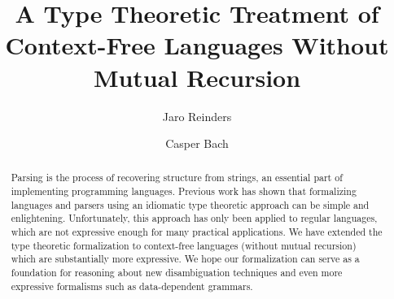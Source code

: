 \documentclass[runningheads]{llncs}
\begin{document}
%
\title{A Type Theoretic Treatment of Context-Free Languages Without Mutual Recursion}
%
%
\author{Jaro Reinders \and
Casper Bach}
%


\maketitle              %

\begin{abstract}
Parsing is the process of recovering structure from strings, an essential part of implementing programming languages.
Previous work has shown that formalizing languages and parsers using an idiomatic type theoretic approach can be simple and enlightening.
Unfortunately, this approach has only been applied to regular languages, which are not expressive enough for many practical applications.
We have extended the type theoretic formalization to context-free languages (without mutual recursion) which are substantially more expressive.
We hope our formalization can serve as a foundation for reasoning about new disambiguation techniques and even more expressive formalisms such as data-dependent grammars.
\end{abstract}

%
%
\end{document}
